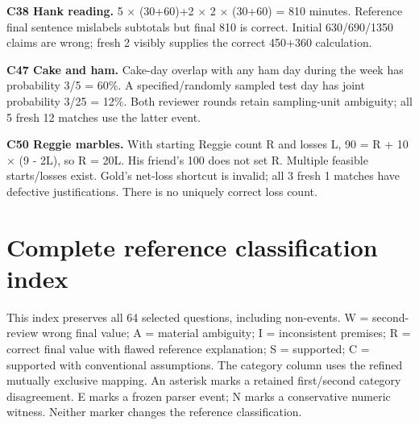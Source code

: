 \documentclass[11pt,a4paper]{article}
\begin{document}
\textbf{C38 Hank reading.} 5 × (30+60)+2 × 2 × (30+60) = 810 minutes.
Reference final sentence mislabels subtotals but final 810 is correct.
Initial 630/690/1350 claims are wrong; fresh 2 visibly supplies the
correct 450+360 calculation.

\textbf{C47 Cake and ham.} Cake-day overlap with any ham day during the
week has probability 3/5 = 60\%. A specified/randomly sampled test day
has joint probability 3/25 = 12\%. Both reviewer rounds retain
sampling-unit ambiguity; all 5 fresh 12 matches use the latter event.

\textbf{C50 Reggie marbles.} With starting Reggie count R and losses L,
90 = R + 10 × (9 - 2L), so R = 20L. His friend's 100 does not set R.
Multiple feasible starts/losses exist. Gold's net-loss shortcut is
invalid; all 3 fresh 1 matches have defective justifications. There is
no uniquely correct loss count.

\section{Complete reference classification
index}\label{complete-reference-classification-index}

This index preserves all 64 selected questions, including non-events. W
= second-review wrong final value; A = material ambiguity; I =
inconsistent premises; R = correct final value with flawed reference
explanation; S = supported; C = supported with conventional assumptions.
The category column uses the refined mutually exclusive mapping. An
asterisk marks a retained first/second category disagreement. E marks a
frozen parser event; N marks a conservative numeric witness. Neither
marker changes the reference classification.
\end{document}
